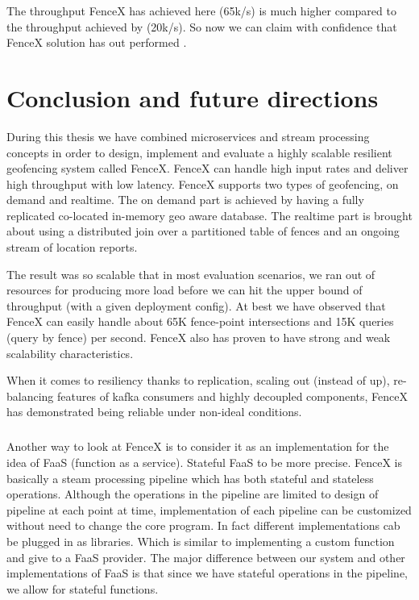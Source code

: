 \documentclass[a4]{report}
\begin{document}
    The throughput FenceX has achieved here (65k/s) is much higher compared to the throughput achieved by
    \cite{Nechifor_Comnac_2013} (20k/s).
    So now we can claim with confidence that FenceX solution has out performed \cite{Nechifor_Comnac_2013}.

    \clearpage


    \chapter{Conclusion and future directions}
    During this thesis we have combined microservices and stream processing concepts in order to design, implement
    and evaluate a highly scalable resilient geofencing system called FenceX.
    FenceX can handle high input rates and deliver high throughput with low latency.
    FenceX supports two types of geofencing, on demand and realtime.
    The on demand part is achieved by having a fully replicated co-located in-memory geo aware database.
    The realtime part is brought about using a distributed join over a partitioned table of fences and an ongoing
    stream of location reports.

    The result was so scalable that in most evaluation scenarios, we ran out of resources for producing more load
    before we can hit the upper bound of throughput (with a given deployment config).
    At best we have observed that FenceX can easily handle about 65K fence-point intersections and 15K queries (query by
    fence) per second.
    FenceX also has proven to have strong and weak scalability characteristics.

    When it comes to resiliency thanks to replication, scaling out (instead of up), re-balancing features of kafka
    consumers and highly decoupled components, FenceX has demonstrated being reliable under non-ideal conditions.

    \paragraph{}
    Another way to look at FenceX is to consider it as an implementation for the idea of FaaS (function as a service).
    Stateful FaaS to be more precise.
    FenceX is basically a steam processing pipeline which has both stateful and stateless operations.
    Although the operations in the pipeline are limited to design of pipeline at each point at time, implementation
    of each pipeline can be customized without need to change the core program.
    In fact different implementations cab be plugged in as libraries.
    Which is similar to implementing a custom function and give to a FaaS provider.
    The major difference between our system and other implementations of FaaS is that since we have stateful
    operations in the pipeline, we allow for stateful functions.
\end{document}
